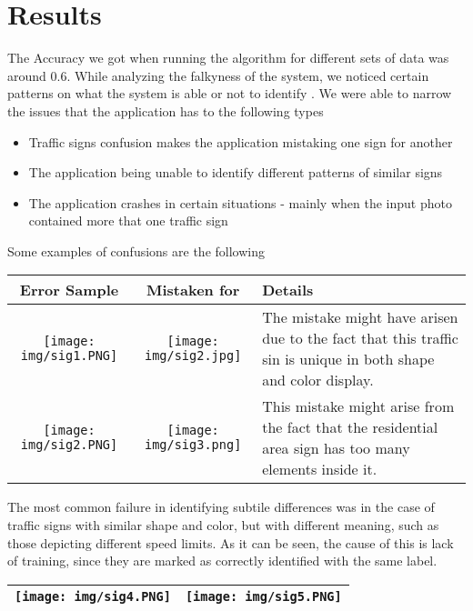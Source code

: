 \documentclass[runningheads,a4paper,11pt]{report}
\begin{document}
\section{Results}

The Accuracy we got when running the algorithm for different sets of data was around 0.6. While analyzing the falkyness of the system, we noticed certain patterns on what the system is able or not to identify .  We were able to narrow the issues that the application has to the following types

\begin{itemize}
  \item Traffic signs confusion makes the application mistaking one sign for another
  \item The application being unable to identify different patterns of similar signs
  \item The application crashes in certain situations - mainly when the input photo contained more that one traffic sign
\end{itemize}


Some examples of confusions are the following
\begin{center}
 \begin{tabular}{||c | c | p{7cm}||} 
 \hline
 Error Sample & Mistaken for & Details \\ [0.5ex] 
 \hline\hline
 \texttt{[image: img/sig1.PNG]} & \texttt{[image: img/sig2.jpg]} & The mistake might have arisen due to the fact that this traffic sin is unique in both shape and color display. \\ 
 \hline
  \texttt{[image: img/sig2.PNG]} &  \texttt{[image: img/sig3.png]} & This mistake might arise from the fact that the residential area sign has too many elements inside it. \\
 \hline

\end{tabular}
\end{center}

The most common failure in identifying subtile differences was in the case of traffic signs with similar shape and color, but with different meaning, such as those depicting different speed limits. As it can be seen, the cause of this is lack of training, since they are marked as correctly identified with the same label.

\begin{center}
 \begin{tabular}{||c | c||} 
 \hline\hline
 \texttt{[image: img/sig4.PNG]} & \texttt{[image: img/sig5.PNG]} \\ 
 \hline

\end{tabular}
\end{center}
\end{document}
